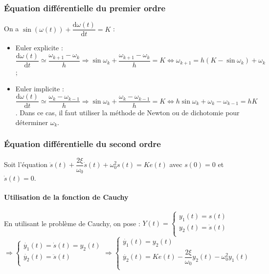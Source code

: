\subsubsection{Équation différentielle du premier ordre}
On a $\sin \left(\omega(t)\right) + \dfrac{\text{d}\omega(t)}{\text{d}t}=K$ :
\begin{itemize}
\item Euler explicite : $\dfrac{\text{d} \omega(t)}{\text{d}t}\simeq \dfrac{\omega_{k+1}-\omega_k}{h} \Rightarrow  \sin \omega_k +  \dfrac{\omega_{k+1}-\omega_k}{h}=K \Leftrightarrow  \omega_{k+1}=h\left( K - \sin \omega_k\right)+\omega_k$;
\item Euler implicite : $\dfrac{\text{d} \omega(t)}{\text{d}t}\simeq \dfrac{\omega_{k}-\omega_{k-1}}{h} \Rightarrow \sin \omega_k +  \dfrac{\omega_{k}-\omega_{k-1}}{h}=K \Leftrightarrow h\sin \omega_k +  \omega_{k}-\omega_{k-1}=hK$. Dans ce cas, il faut utiliser la méthode de Newton ou de dichotomie pour déterminer $\omega_k$.
\end{itemize}


\subsubsection{Équation différentielle du second ordre}

 Soit l'équation $\ddot{s}(t) + \dfrac{2\xi}{\omega_0} \dot{s}(t) + \omega_0^2 s(t) = Ke(t)$ avec $s(0)=0$ et $\dot{s}(t)=0$.

\paragraph*{Utilisation de la fonction de Cauchy}
En utilisant le problème de Cauchy, on pose : 
$Y(t)=
\left\{
\begin{array}{l}
y_1(t) = s(t) \\
y_2(t) = \dot{s}(t) \\
\end{array}
\right.$
$\Rightarrow 
\left\{
\begin{array}{l}
\dot{y_1}(t) = \dot{s}(t) = y_2(t) \\
\dot{y_2}(t) = \ddot{s}(t) \\
\end{array}
\right.
\Rightarrow 
\left\{
\begin{array}{l}
\dot{y_1}(t) = y_2(t) \\
\dot{y_2}(t) =  Ke(t) - \dfrac{2\xi}{\omega_0} y_2(t)- \omega_0^2 y_1(t) \\
\end{array}
\right.
$


